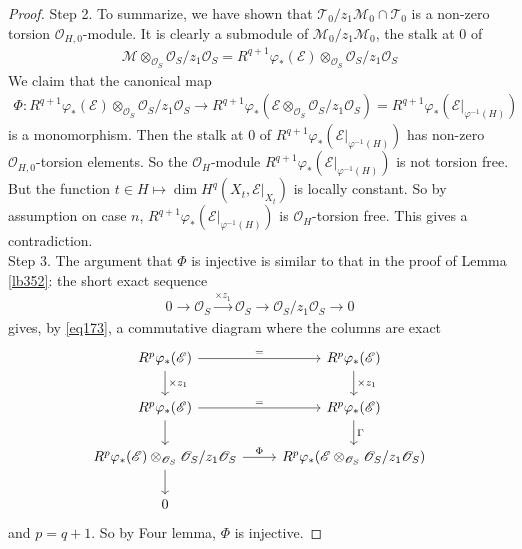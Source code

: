\documentclass[12pt,b5paper,notitlepage]{report}
\theoremstyle{definition}
\theoremstyle{plain}
\newcommand{\scr}{\mathscr}
\numberwithin{equation}{section}
\begin{document}
\begin{proof}
Step 2. To summarize, we have shown that $\scr T_0/z_1\scr M_0\cap\scr T_0$ is a non-zero torsion $\scr O_{H,0}$-module. It is clearly a submodule of $\scr M_0/z_1\scr M_0$, the stalk at $0$ of
\begin{align*}
\scr M\otimes_{\scr O_S}\scr O_S/z_1\scr O_S=R^{q+1}\varphi_*(\scr E)\otimes_{\scr O_S}\scr O_S/z_1\scr O_S 
\end{align*}
We claim that the canonical map
\begin{align*}
\Phi:R^{q+1}\varphi_*(\scr E)\otimes_{\scr O_S}\scr O_S/z_1\scr O_S \rightarrow R^{q+1}\varphi_*(\scr E\otimes_{\scr O_S}\scr O_S/z_1\scr O_S)=R^{q+1}\varphi_*(\scr E|_{\varphi^{-1}(H)})
\end{align*}
is a monomorphism. Then the stalk at $0$ of $R^{q+1}\varphi_*(\scr E|_{\varphi^{-1}(H)})$ has non-zero $\scr O_{H,0}$-torsion elements. So the $\scr O_H$-module $R^{q+1}\varphi_*(\scr E|_{\varphi^{-1}(H)})$ is not torsion free. But the function $t\in H\mapsto \dim H^q(X_t,\scr E|_{X_t})$ is locally constant. So by assumption on case $n$, $R^{q+1}\varphi_*(\scr E|_{\varphi^{-1}(H)})$ is $\scr O_H$-torsion free. This gives a contradiction.\\

Step 3. The argument that $\Phi$ is injective is similar to that in the proof of Lemma \ref{lb352}: the short exact sequence
\begin{align}\label{eq185}
0\rightarrow \scr O_S\xrightarrow{\times z_1}\scr O_S\rightarrow\scr O_S/z_1\scr O_S\rightarrow 0   
\end{align}
gives, by \eqref{eq173}, a commutative diagram where the columns are exact
\begin{equation}\label{eq186}
\begin{tikzcd}
R^p\varphi_*(\scr E)\arrow[r,"="] \arrow[d,"\times z_1"]           & R^p\varphi_*(\scr E) \arrow[d,"\times z_1"]           \\
R^p\varphi_*(\scr E) \arrow[d] \arrow[r, "="] & R^p\varphi_*(\scr E) \arrow[d, "\Gamma"] \\
R^p\varphi_*(\scr E)\otimes_{\scr O_S}\scr O_S/z_1\scr O_S \arrow[r, "\Phi"] \arrow[d]   & R^p\varphi_*(\scr E\otimes_{\scr O_S}\scr O_S/z_1\scr O_S)                     \\
0                               &                      
\end{tikzcd}
\end{equation}
and $p=q+1$. So by Four lemma, $\Phi$ is injective.
\end{proof}
\end{document}
